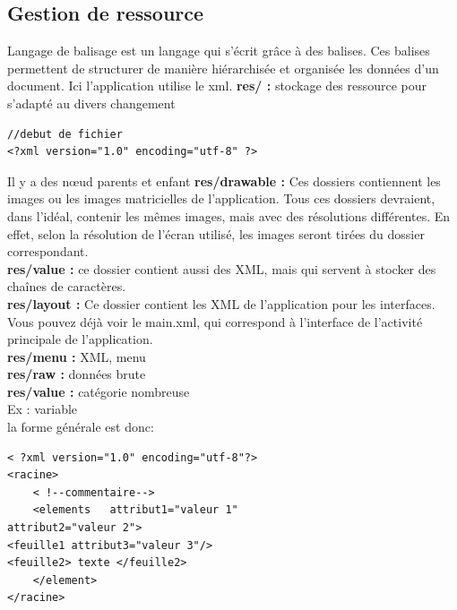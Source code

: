 \subsection{Gestion de ressource}
Langage de balisage est un langage qui s'écrit grâce à des balises. Ces balises permettent de structurer de manière hiérarchisée et organisée les données d'un document. Ici l’application utilise le xml.
\textbf{res/ :} stockage des ressource pour s’adapté au divers changement
\begin{lstlisting}
//debut de fichier
<?xml version="1.0" encoding="utf-8" ?>
\end{lstlisting}
Il y a des nœud parents et enfant
\textbf{res/drawable :} Ces dossiers contiennent les images ou les images matricielles de l'application. Tous ces dossiers devraient, dans l'idéal, contenir les mêmes images, mais avec des résolutions différentes. En effet, selon la résolution de l'écran utilisé, les images seront tirées du dossier correspondant.\\
\textbf{res/value :} ce dossier contient aussi des XML, mais qui servent à stocker des chaînes de caractères.\\
\textbf{res/layout :} Ce dossier contient les XML de l'application pour les interfaces. Vous pouvez déjà voir le main.xml, qui correspond à l'interface de l'activité principale de l'application.\\
\textbf{res/menu :} XML, menu\\
\textbf{res/raw :} données brute\\
\textbf{res/value :} catégorie nombreuse \\
	Ex : variable\\
la forme générale est donc:
\begin{lstlisting}
< ?xml version="1.0" encoding="utf-8"?>
<racine>
	< !--commentaire-->
	<elements 	attribut1="valeur 1"
attribut2="valeur 2">
<feuille1 attribut3="valeur 3"/>
<feuille2> texte </feuille2>
	</element>
</racine>
\end{lstlisting}
